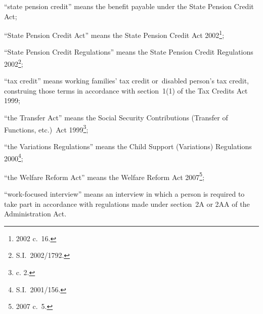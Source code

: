 \documentclass[12pt,a4paper]{article}
\begin{document}
\begin{enumerate}
“state pension credit” means the benefit payable under the State Pension Credit Act;

“State Pension Credit Act” means the State Pension Credit Act 2002\footnote{2002 c.~16.};

“State Pension Credit Regulations” means the State Pension Credit Regulations 2002\footnote{S.I.~2002/1792.};

“tax credit” means working families' tax credit or~disabled person’s tax credit, construing those terms in accordance with section~1(1) of the Tax Credits Act 1999;

“the Transfer Act” means the Social Security Contributions (Transfer of Functions, etc.)\ Act 1999\footnote{ c. 2.};

“the Variations Regulations” means the Child Support (Variations) Regulations 2000\footnote{\frenchspacing S.I.~2001/156.};

“the Welfare Reform Act” means the Welfare Reform Act 2007\footnote{2007 c.~5.};



“work-focused interview” means an interview in which a person is required to take part in accordance with regulations made under section~2A or 2AA of the Administration Act.

\end{enumerate}
\end{document}
